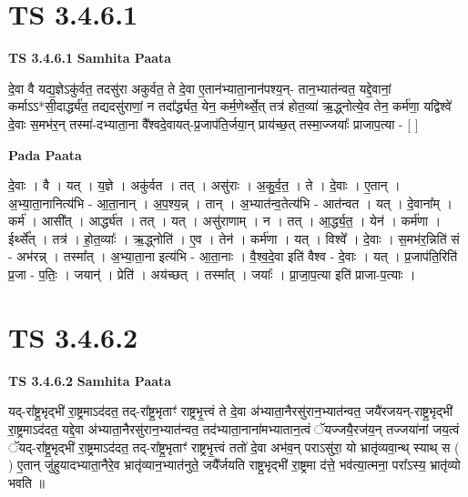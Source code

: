 \documentclass[17pt]{extarticle}
\begin{document}
\section*{ TS 3.4.6.1 }

\textbf{TS 3.4.6.1 } \newline
\textbf{Samhita Paata} \newline

दे॒वा वै यद्य॒ज्ञेऽकु॑र्वत॒ तदसु॑रा अकुर्वत॒ ते दे॒वा ए॒तान॑भ्याता॒नान॑पश्य॒न्- तान॒भ्यात॑न्वत॒ यद्दे॒वानां॒ कर्माऽऽ*सी॒दार्द्ध्य॑त॒ तद्यदसु॑राणां॒ न तदा᳚र्द्ध्यत॒ येन॒ कर्म॒णेर्थ्से॒त् तत्र॑ होत॒व्या॑ ऋ॒द्ध्नोत्ये॒व तेन॒ कर्म॑णा॒ यद्विश्वे॑ दे॒वाः स॒मभ॑र॒न् तस्मा॑-दभ्याता॒ना वै᳚श्वदे॒वायत्-प्र॒जाप॑ति॒र्जया॒न् प्राय॑च्छ॒त् तस्मा॒ज्जयाः᳚ प्राजाप॒त्या - [  ] \newline

\textbf{Pada Paata} \newline

दे॒वाः । वै । यत् । य॒ज्ञे । अकु॑र्वत । तत् । असु॑राः । अ॒कु॒र्व॒त॒ । ते । दे॒वाः । ए॒तान् । अ॒भ्या॒ता॒नानित्य॑भि - आ॒ता॒नान् । अ॒प॒श्य॒न्न् । तान् । अ॒भ्यात॑न्व॒तेत्य॑भि - आत॑न्वत । यत् । दे॒वाना᳚म् । कर्म॑ । आसी᳚त् । आर्द्ध्य॑त । तत् । यत् । असु॑राणाम् । न । तत् । आ॒र्द्ध्य॒त॒ । येन॑ । कर्म॑णा । ईर्थ्से᳚त् । तत्र॑ । हो॒त॒व्याः᳚ । ऋ॒द्ध्नोति॑ । ए॒व । तेन॑ । कर्म॑णा । यत् । विश्वे᳚ । दे॒वाः । स॒मभ॑र॒न्निति॑ सं - अभ॑रन्न् । तस्मा᳚त् । अ॒भ्या॒ता॒ना इत्य॑भि - आ॒ता॒नाः । वै॒श्व॒दे॒वा इति॑ वैश्व - दे॒वाः । यत् । प्र॒जाप॑ति॒रिति॑ प्र॒जा - प॒तिः॒ । जयान्॑ । प्रेति॑ । अय॑च्छत् । तस्मा᳚त् । जयाः᳚ । प्रा॒जा॒प॒त्या इति॑ प्राजा-प॒त्याः ।  \newline




\section*{ TS 3.4.6.2 }

\textbf{TS 3.4.6.2 } \newline
\textbf{Samhita Paata} \newline

यद्-रा᳚ष्ट्र॒भृद्भी॑ रा॒ष्ट्रमाऽद॑दत॒ तद्-रा᳚ष्ट्र॒भृताꣳ॑ राष्ट्रभृ॒त्त्वं ते दे॒वा अ॑भ्याता॒नैरसु॑रान॒भ्यात॑न्वत॒ जयै॑रजयन्-राष्ट्र॒भृद्भी॑ रा॒ष्ट्रमाऽद॑दत॒ यद्दे॒वा अ॑भ्याता॒नैरसु॑रान॒भ्यात॑न्वत॒ तद॑भ्याता॒नाना॑मभ्यातान॒त्वं ॅयज्जयै॒रज॑य॒न् तज्जया॑नां जय॒त्वं ॅयद्-रा᳚ष्ट्र॒भृद्भी॑ रा॒ष्ट्रमाऽद॑दत॒ तद्-रा᳚ष्ट्र॒भृताꣳ॑ राष्ट्रभृ॒त्त्वं ततो॑ दे॒वा अभ॑व॒न् पराऽसु॑रा॒ यो भ्रातृ॑व्यवा॒न्थ् स्याथ् स ( ) ए॒तान् जु॑हुयादभ्याता॒नैरे॒व भ्रातृ॑व्यान॒भ्यात॑नुते॒ जयै᳚र्जयति राष्ट्र॒भृद्भी॑ रा॒ष्ट्रमा द॑त्ते॒ भव॑त्या॒त्मना॒ परा᳚ऽस्य॒ भ्रातृ॑व्यो भवति ॥ \newline
\end{document}
